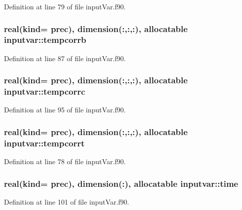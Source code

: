 Definition at line 79 of file input\-Var.\-f90.

\hypertarget{classinputvar_a4270f23d875d4a85d7bd5d6699205d03}{
\subsubsection[{tempcorrb}]{\setlength{\rightskip}{0pt plus 5cm}real(kind= prec), dimension(\-:,\-:,\-:), allocatable inputvar\-::tempcorrb}}\label{classinputvar_a4270f23d875d4a85d7bd5d6699205d03}


Definition at line 87 of file input\-Var.\-f90.

\hypertarget{classinputvar_a378a362979a22545cd843bbf687ca511}{
\subsubsection[{tempcorrc}]{\setlength{\rightskip}{0pt plus 5cm}real(kind= prec), dimension(\-:,\-:,\-:), allocatable inputvar\-::tempcorrc}}\label{classinputvar_a378a362979a22545cd843bbf687ca511}


Definition at line 95 of file input\-Var.\-f90.

\hypertarget{classinputvar_a918356589b5f04f76333e6a65de35fb8}{
\subsubsection[{tempcorrt}]{\setlength{\rightskip}{0pt plus 5cm}real(kind= prec), dimension(\-:,\-:,\-:), allocatable inputvar\-::tempcorrt}}\label{classinputvar_a918356589b5f04f76333e6a65de35fb8}


Definition at line 78 of file input\-Var.\-f90.

\hypertarget{classinputvar_a7d20a57b0a7dfe6c386e831f25636546}{
\subsubsection[{time}]{\setlength{\rightskip}{0pt plus 5cm}real(kind= prec), dimension(\-:), allocatable inputvar\-::time}}\label{classinputvar_a7d20a57b0a7dfe6c386e831f25636546}


Definition at line 101 of file input\-Var.\-f90.

